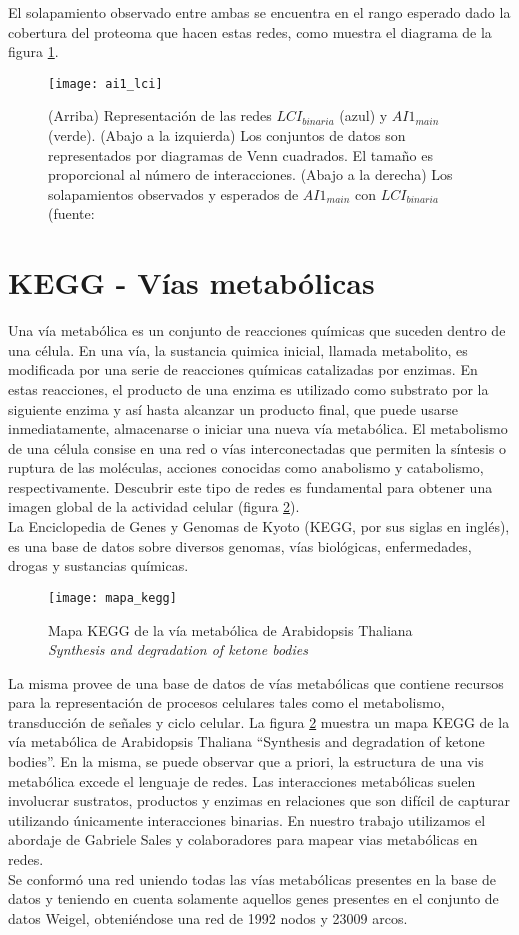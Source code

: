 El solapamiento observado entre ambas se encuentra en el rango esperado dado la cobertura del proteoma que hacen estas redes, como muestra el diagrama de la figura \ref{fig:ai1_lci}.
\begin{figure}[h]
    \centering
    \texttt{[image: ai1\_lci]}
    \caption{(Arriba) Representación de las redes $LCI_{binaria}$ (azul) y $AI1_{main}$ (verde). (Abajo a la izquierda) Los conjuntos de datos son representados por diagramas de Venn cuadrados. El tamaño es proporcional al número de interacciones. (Abajo a la derecha) Los solapamientos observados y esperados de $AI1_{main}$ con $LCI_{binaria}$ (fuente: \cite{Hahn2013}} 
    \label{fig:ai1_lci}
\end{figure}
\section{KEGG - Vías metabólicas}
\label{sec:kegg}
Una vía metabólica es un conjunto de reacciones químicas que suceden dentro de una célula. En una vía, la sustancia quimica inicial, llamada metabolito, es modificada por una serie de reacciones químicas catalizadas por enzimas. En estas reacciones, el producto de una enzima es utilizado como substrato por la siguiente enzima y así hasta alcanzar un producto final, que puede usarse inmediatamente, almacenarse o iniciar una nueva vía metabólica. El metabolismo de una célula consise en una red o vías interconectadas que permiten la síntesis o ruptura de las moléculas, acciones conocidas como anabolismo y catabolismo, respectivamente. Descubrir este tipo de redes es fundamental para obtener una imagen global de la actividad celular (figura \ref{fig:mapa_kegg}).\\
La Enciclopedia de Genes y Genomas de Kyoto (KEGG, por sus siglas en inglés), es una base de datos sobre diversos genomas, vías biológicas, enfermedades, drogas y sustancias químicas.
\begin{figure}[h]
    \centering
    \texttt{[image: mapa\_kegg]}
    \caption{Mapa KEGG de la vía metabólica de Arabidopsis Thaliana  \textit{Synthesis and degradation of ketone bodies}}
    \label{fig:mapa_kegg}
\end{figure}
La misma provee de una base de datos de vías metabólicas que contiene recursos para la representación de procesos celulares tales como el metabolismo, transducción de señales y ciclo celular. La figura \ref{fig:mapa_kegg} muestra un mapa KEGG de la vía metabólica de Arabidopsis Thaliana ``Synthesis and degradation of ketone bodies''. En la misma, se puede observar que a priori, la estructura de una vis metabólica excede el lenguaje de redes. Las interacciones metabólicas suelen involucrar sustratos, productos y enzimas en relaciones que son difícil de capturar utilizando únicamente interacciones binarias. 
En nuestro trabajo utilizamos el abordaje de Gabriele Sales y colaboradores \cite{Graphite2015} para mapear vias metabólicas en redes.\\
Se conformó una red uniendo todas las vías metabólicas presentes en la base de datos y teniendo en cuenta solamente aquellos genes presentes en el conjunto de datos Weigel, obteniéndose una red de 1992 nodos y 23009 arcos.
\cite{Segal2003, Kanehisa2000}
